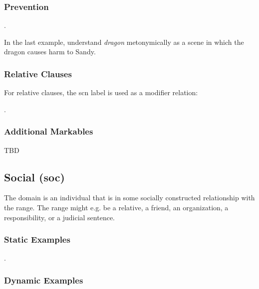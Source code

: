 \documentclass[a4paper]{article}
\begin{document}
\subsubsection{Prevention}

\ex. 

In the last example, understand \emph{dragon} metonymically as a scene in which
the dragon causes harm to Sandy.

\subsubsection{Relative Clauses}

For relative clauses, the \textsf{scn} label is used as a modifier relation:

\ex. 

\subsubsection{Additional Markables}

TBD

\subsection{Social (\textsf{soc})}
\label{sec:soc}

The domain is an individual that is in some socially constructed relationship with the range. The range might e.g. be a relative, a friend, an organization, a responsibility, or a judicial sentence.

\subsubsection{Static Examples}

\ex. \smaller

\subsubsection{Dynamic Examples}
\end{document}
